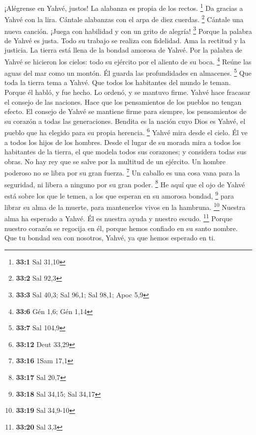 \begin{paracol}{2}
 ¡Alégrense en Yahvé, justos! La alabanza es propia de los
rectos. \footnote{\textbf{33:1} Sal 31,10}  Da gracias a
Yahvé con la lira. Cántale alabanzas con el arpa de diez cuerdas.
\footnote{\textbf{33:2} Sal 92,3}  Cántale una nueva
canción. ¡Juega con habilidad y con un grito de alegría! \footnote{\textbf{33:3}
  Sal 40,3; Sal 96,1; Sal 98,1; Apoc 5,9}  Porque la
palabra de Yahvé es justa. Todo su trabajo se realiza con fidelidad.
 Ama la rectitud y la justicia. La tierra está llena de la
bondad amorosa de Yahvé.  Por la palabra de Yahvé se
hicieron los cielos: todo su ejército por el aliento de su boca.
\footnote{\textbf{33:6} Gén 1,6; Gén 1,14}  Reúne las
aguas del mar como un montón. Él guarda las profundidades en almacenes.
\footnote{\textbf{33:7} Sal 104,9}  Que toda la tierra
tema a Yahvé. Que todos los habitantes del mundo le teman.
 Porque él habló, y fue hecho. Lo ordenó, y se mantuvo
firme.  Yahvé hace fracasar el consejo de las naciones.
Hace que los pensamientos de los pueblos no tengan efecto.
 El consejo de Yahvé se mantiene firme para siempre, los
pensamientos de su corazón a todas las generaciones. 
Bendita es la nación cuyo Dios es Yahvé, el pueblo que ha elegido para
su propia herencia. \footnote{\textbf{33:12} Deut 33,29} 
Yahvé mira desde el cielo. Él ve a todos los hijos de los hombres.
 Desde el lugar de su morada mira a todos los habitantes
de la tierra,  el que modela todos sus corazones; y
considera todas sus obras.  No hay rey que se salve por
la multitud de un ejército. Un hombre poderoso no se libra por su gran
fuerza. \footnote{\textbf{33:16} 1Sam 17,1}  Un caballo
es una cosa vana para la seguridad, ni libera a ninguno por su gran
poder. \footnote{\textbf{33:17} Sal 20,7}  He aquí que el
ojo de Yahvé está sobre los que le temen, a los que esperan en su
amorosa bondad, \footnote{\textbf{33:18} Sal 34,15; Sal 34,17}
 para librar su alma de la muerte, para mantenerlos vivos
en la hambruna. \footnote{\textbf{33:19} Sal 34,9-10} 
Nuestra alma ha esperado a Yahvé. Él es nuestra ayuda y nuestro escudo.
\footnote{\textbf{33:20} Sal 3,3}  Porque nuestro corazón
se regocija en él, porque hemos confiado en su santo nombre.
 Que tu bondad sea con nosotros, Yahvé, ya que hemos
esperado en ti.


\end{paracol}
